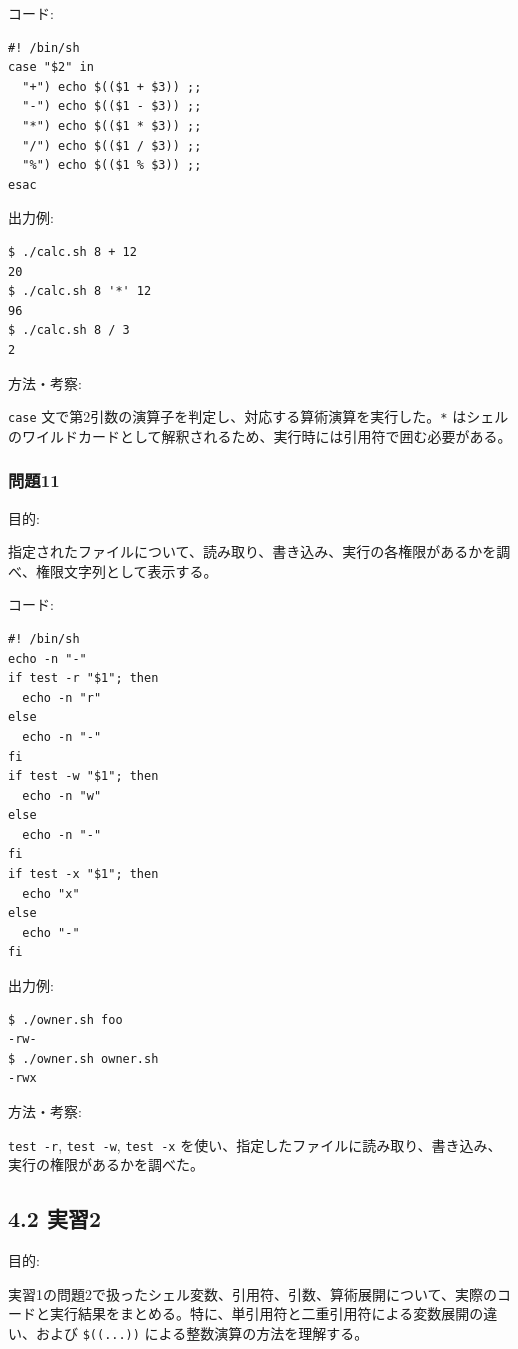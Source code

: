 \documentclass[12pt,a4paper]{jsarticle}
\begin{document}
コード:\par
\begin{lstlisting}
#! /bin/sh
case "$2" in
  "+") echo $(($1 + $3)) ;;
  "-") echo $(($1 - $3)) ;;
  "*") echo $(($1 * $3)) ;;
  "/") echo $(($1 / $3)) ;;
  "%") echo $(($1 % $3)) ;;
esac
\end{lstlisting}
出力例:\par
\begin{lstlisting}
$ ./calc.sh 8 + 12
20
$ ./calc.sh 8 '*' 12
96
$ ./calc.sh 8 / 3
2
\end{lstlisting}
方法・考察:\par
\texttt{case} 文で第2引数の演算子を判定し、対応する算術演算を実行した。\texttt{*} はシェルのワイルドカードとして解釈されるため、実行時には引用符で囲む必要がある。

\vspace{0.6cm}

\subsubsection*{問題11}
目的:\par
指定されたファイルについて、読み取り、書き込み、実行の各権限があるかを調べ、権限文字列として表示する。

コード:\par
\begin{lstlisting}
#! /bin/sh
echo -n "-"
if test -r "$1"; then
  echo -n "r"
else
  echo -n "-"
fi
if test -w "$1"; then
  echo -n "w"
else
  echo -n "-"
fi
if test -x "$1"; then
  echo "x"
else
  echo "-"
fi
\end{lstlisting}
出力例:\par
\begin{lstlisting}
$ ./owner.sh foo
-rw-
$ ./owner.sh owner.sh
-rwx
\end{lstlisting}
方法・考察:\par
\texttt{test -r}, \texttt{test -w}, \texttt{test -x} を使い、指定したファイルに読み取り、書き込み、実行の権限があるかを調べた。

\vspace{1.0cm}

\subsection*{4.2 実習2}

目的:\par
実習1の問題2で扱ったシェル変数、引用符、引数、算術展開について、実際のコードと実行結果をまとめる。特に、単引用符と二重引用符による変数展開の違い、および \texttt{\$((...))} による整数演算の方法を理解する。
\end{document}
